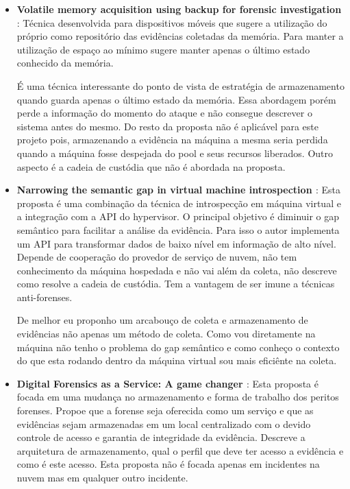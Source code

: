 \documentclass[
	12pt,				%
	openright,			%
	oneside,			%
	a4paper,			%
	english,			%
	french,				%
	spanish,			%
	brazil,				%
	]{abntex2}
\begin{document}
\begin{itemize}
\item \textbf{Volatile memory acquisition using backup for forensic investigation \cite{Dezfouli2012} }: Técnica desenvolvida para dispositivos móveis que sugere a utilização
do próprio como repositório das evidências coletadas da memória. Para manter a utilização de espaço ao mínimo sugere manter apenas o último estado conhecido da memória.
 
É uma técnica interessante do ponto de vista de estratégia de armazenamento quando guarda apenas o último estado da memória. Essa abordagem porém perde a informação do momento 
do ataque e não consegue descrever o sistema antes do mesmo. Do resto da proposta não é aplicável para este projeto pois, armazenando a evidência na máquina a mesma seria perdida
quando a máquina fosse despejada do pool e seus recursos liberados. Outro aspecto é a cadeia de custódia que não é abordada na proposta.\\

\item \textbf{Narrowing the semantic gap in virtual machine introspection \cite{Dolan-Gavitt2011a} }: Esta proposta é uma combinação da técnica de introspecção em máquina virtual
e a integração com a API do hypervisor. O principal objetivo é diminuir o gap semântico para facilitar a análise da evidência. Para isso o autor implementa um API para transformar
dados de baixo nível em informação de alto nível. Depende de cooperação do provedor de serviço de nuvem, não tem conhecimento da máquina hospedada e não vai além da coleta, não 
descreve como resolve a cadeia de custódia. Tem a vantagem de ser imune a técnicas anti-forenses.

De melhor eu proponho um arcabouço de coleta e armazenamento de evidências não apenas um método de coleta. Como vou diretamente na máquina não tenho o problema do gap semântico
 e como conheço o contexto do que esta rodando dentro da máquina virtual sou mais eficiênte na coleta.\\

\item \textbf{Digital Forensics as a Service: A game changer \cite{VanBaar2014} }: Esta proposta é focada em uma mudança no armazenamento e forma de trabalho dos peritos forenses.
Propoe que a forense seja oferecida como um serviço e que as evidências sejam armazenadas em um local centralizado com o devido controle de acesso e garantia de integridade da 
evidência. Descreve a arquitetura de armazenamento, qual o perfil que deve ter acesso a evidência e como é este acesso. Esta proposta não é focada apenas em incidentes na nuvem
mas em qualquer outro incidente.


\end{itemize}
\end{document}
